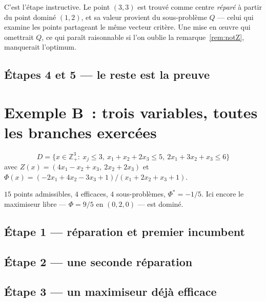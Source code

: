 \documentclass[12pt,a4paper]{report}
\newcommand{\Dset}{D}
\newcommand{\Z}{Z}
\newcommand{\fig}[1]{}
\theoremstyle{plain}
\theoremstyle{definition}
\begin{document}
\noindent
C'est l'étape instructive.  Le point $(3,3)$ est trouvé comme centre
\emph{réparé} à partir du point dominé $(1,2)$, et sa valeur provient du
sous-problème $Q$ --- celui qui examine les points partageant le même vecteur
critère.  Une mise en {\oe}uvre qui omettrait $Q$, ce qui paraît raisonnable si
l'on oublie la remarque~\ref{rem:notZ}, manquerait l'optimum.

\subsection*{Étapes 4 et 5 --- le reste est la preuve}
\begin{center}\fig{a-step4}\end{center}
\begin{center}\fig{a-step5}\end{center}

\section{Exemple B~: trois variables, toutes les branches exercées}

\[
  \Dset = \{x \in \mathbb{Z}^3_+ :\ x_j \leqslant 3,\
  x_1 + x_2 + 2x_3 \leqslant 5,\ 2x_1 + 3x_2 + x_3 \leqslant 6\}
\]
avec $\Z(x) = (4x_1 - x_2 + x_3,\ 2x_2 + 2x_3)$ et
$\Phi(x) = (-2x_1 + 4x_2 - 3x_3 + 1)/(x_1 + 2x_2 + x_3 + 1)$.

$15$ points admissibles, $4$ efficaces, $4$ sous-problèmes,
$\Phi^{*} = -1/5$.  Ici encore le maximiseur libre --- $\Phi = 9/5$ en
$(0,2,0)$ --- est dominé.

\begin{center}
\fig{b-decision}
\end{center}

\subsection*{Étape 1 --- réparation et premier incumbent}
\begin{center}\fig{b-step1}\end{center}

\subsection*{Étape 2 --- une seconde réparation}
\begin{center}\fig{b-step2}\end{center}

\subsection*{Étape 3 --- un maximiseur déjà efficace}
\begin{center}\fig{b-step3}\end{center}
\end{document}
